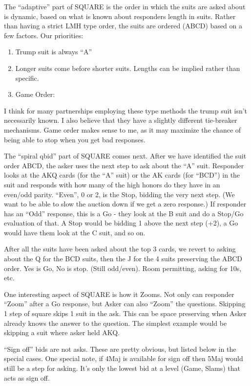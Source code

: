\documentclass[tom-ari]{subfile}
\begin{document}
The ``adaptive'' part of SQUARE is the order in which the suits are asked about is dynamic, based on what is known about responders length in suits.  Rather than having a strict LMH type order, the suits are ordered (ABCD) based on a few factors. Our priorities:

\begin{enumerate}
	\item Trump suit is always ``A''
	\item Longer suits come before shorter suits. Lengths can be implied rather than specific.
	\item Game Order: \heartsuit \spadesuit \clubsuit \diamondsuit
\end{enumerate}

I think for many partnerships employing these type methods the trump suit isn't necessarily known.  I also believe that they have a slightly different tie-breaker mechanisms.  Game order makes sense to me, as it may maximize the chance of being able to stop when you get bad responses.

The ``spiral qbid'' part of SQUARE comes next.  After we have identified the suit order ABCD, the asker uses the next step to ask about the ``A'' suit.  Responder looks at the AKQ cards (for the ``A'' suit) or the AK cards (for ``BCD'') in the suit and responds with how many of the high honors do they have in an even/odd parity.  ``Even'', 0 or 2, is the Stop, bidding the very next step.  (We want to be able to slow the auction down if we get a zero response.)  If responder has an ``Odd'' response, this is a Go - they look at the B suit and do a Stop/Go evaluation of that.  A Stop would be bidding 1 above the next step (+2), a Go would have them look at the C suit, and so on.

After all the suits have been asked about the top 3 cards, we revert to asking about the Q for the BCD suits, then the J for the 4 suits preserving the ABCD order.  Yes is Go, No is stop.  (Still odd/even).  Room permitting, asking for 10s, etc.

One interesting aspect of SQUARE is how it Zooms.  Not only can responder ``Zoom'' after a Go response, but Asker can also ``Zoom'' the questions.  Skipping 1 step of square skips 1 suit in the ask.  This can be space preserving when Asker already knows the answer to the question.  The simplest example would be skipping a suit where asker held AKQ.

``Sign off'' bids are not asks. These are pretty obvious, but listed below in the special cases.  One special note, if 4Maj is available for sign off then 5Maj would still be a step for asking.  It's only the lowest bid at a level (Game, Slams) that acts as sign off.
\end{document}
